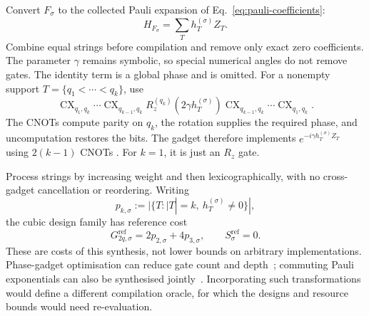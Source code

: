 \documentclass[a4paper,onecolumn,11pt,unpublished]{quantumarticle}
\theoremstyle{remark}
\begin{document}
Convert $F_\sigma$ to the collected Pauli expansion of
Eq.~\eqref{eq:pauli-coefficients}:
\begin{equation}
H_{F_\sigma}=\sum_T h_T^{(\sigma)}Z_T.
\label{eq:reference-collected-hamiltonian}
\end{equation}
Combine equal strings before compilation and remove only exact zero
coefficients.  The parameter $\gamma$ remains symbolic, so special numerical
angles do not remove gates.  The identity term is a global phase and is omitted.
For a nonempty support $T=\{q_1<\cdots<q_k\}$, use
\begin{equation}
\operatorname{CX}_{q_1,q_k}\cdots\operatorname{CX}_{q_{k-1},q_k}
R_z^{(q_k)}(2\gamma h_T^{(\sigma)})
\operatorname{CX}_{q_{k-1},q_k}\cdots\operatorname{CX}_{q_1,q_k}.
\label{eq:reference-parity-gadget}
\end{equation}
The CNOTs compute parity on $q_k$, the rotation supplies the required phase,
and uncomputation restores the bits.  The gadget therefore implements
$e^{-i\gamma h_T^{(\sigma)}Z_T}$ using $2(k-1)$ CNOTs
\cite{CampbellDahl2022,Verchere2023}.  For $k=1$, it is just an $R_z$ gate.

Process strings by increasing weight and then lexicographically, with no
cross-gadget cancellation or reordering.  Writing
\begin{equation}
p_{k,\sigma}:=|\{T:|T|=k,\ h_T^{(\sigma)}\neq0\}|,
\label{eq:reference-pauli-count}
\end{equation}
the cubic design family has reference cost
\begin{equation}
G_{2q,\sigma}^{\mathrm{ref}}=2p_{2,\sigma}+4p_{3,\sigma},
\qquad S_\sigma^{\mathrm{ref}}=0.
\label{eq:reference-gate-count}
\end{equation}
These are costs of this synthesis, not lower bounds on arbitrary implementations.
Phase-gadget optimisation can reduce gate count and depth~\cite{CowtanPhase2020};
commuting Pauli exponentials can also be synthesised jointly~\cite{CowtanUCC2020}.
Incorporating such transformations would define a different compilation
oracle, for which the designs and resource bounds would need re-evaluation.
\end{document}
